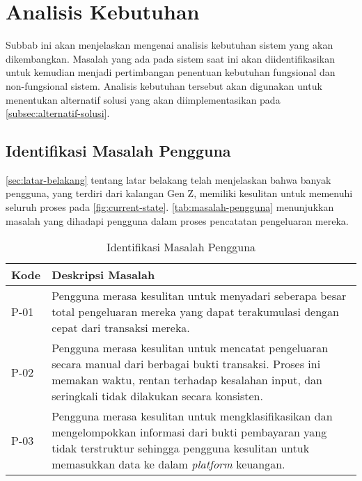 \section{Analisis Kebutuhan}
\label{sec:analisis-kebutuhan}

Subbab ini akan menjelaskan mengenai analisis kebutuhan sistem yang akan dikembangkan. Masalah yang ada pada sistem saat ini akan diidentifikasikan untuk kemudian menjadi pertimbangan penentuan kebutuhan fungsional dan non-fungsional sistem. Analisis kebutuhan tersebut akan digunakan untuk menentukan alternatif solusi yang akan diimplementasikan pada \autoref{subsec:alternatif-solusi}.

\subsection{Identifikasi Masalah Pengguna}
\label{subsec:identifikasi-masalah-pengguna}
\autoref{sec:latar-belakang} tentang latar belakang telah menjelaskan bahwa banyak pengguna, yang terdiri dari kalangan Gen Z, memiliki kesulitan untuk memenuhi seluruh proses pada \autoref{fig:current-state}. \autoref{tab:masalah-pengguna} menunjukkan masalah yang dihadapi pengguna dalam proses pencatatan pengeluaran mereka.

\begin{table}[h!]
\caption{Identifikasi Masalah Pengguna}
\label{tab:masalah-pengguna}
\begin{tabularx}{\linewidth}{|l|X|}
\hline
\textbf{Kode} & \textbf{Deskripsi Masalah} \\
\hline
P-01 & Pengguna merasa kesulitan untuk menyadari seberapa besar total pengeluaran mereka yang dapat terakumulasi dengan cepat dari transaksi mereka. \\
\hline
P-02 & Pengguna merasa kesulitan untuk mencatat pengeluaran secara manual dari berbagai bukti transaksi. Proses ini memakan waktu, rentan terhadap kesalahan input, dan seringkali tidak dilakukan secara konsisten. \\
\hline
P-03 & Pengguna merasa kesulitan untuk mengklasifikasikan dan mengelompokkan informasi dari bukti pembayaran yang tidak terstruktur sehingga pengguna kesulitan untuk memasukkan data ke dalam \emph{platform} keuangan. \\
\hline
\end{tabularx}
\end{table}

